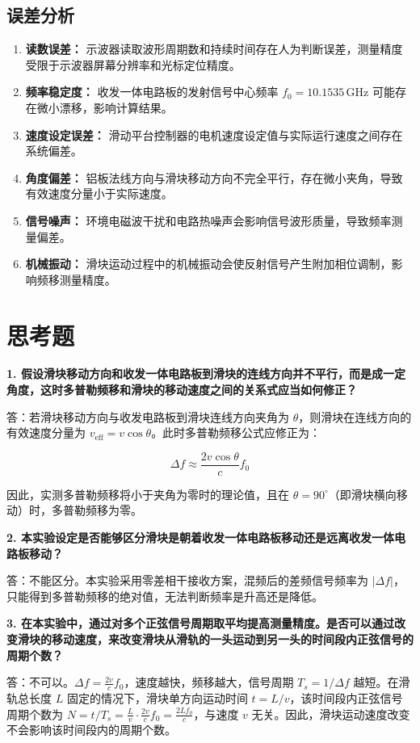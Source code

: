 \documentclass{../ElectromagneticFieldTemplate}
\begin{document}
\subsection{误差分析}

\begin{enumerate}
    \item \textbf{读数误差：} 示波器读取波形周期数和持续时间存在人为判断误差，测量精度受限于示波器屏幕分辨率和光标定位精度。
    \item \textbf{频率稳定度：} 收发一体电路板的发射信号中心频率 \(f_0 = 10.1535\,\text{GHz}\) 可能存在微小漂移，影响计算结果。
    \item \textbf{速度设定误差：} 滑动平台控制器的电机速度设定值与实际运行速度之间存在系统偏差。
    \item \textbf{角度偏差：} 铝板法线方向与滑块移动方向不完全平行，存在微小夹角，导致有效速度分量小于实际速度。
    \item \textbf{信号噪声：} 环境电磁波干扰和电路热噪声会影响信号波形质量，导致频率测量偏差。
    \item \textbf{机械振动：} 滑块运动过程中的机械振动会使反射信号产生附加相位调制，影响频移测量精度。
\end{enumerate}

\section{思考题}

\textbf{1. 假设滑块移动方向和收发一体电路板到滑块的连线方向并不平行，而是成一定角度，这时多普勒频移和滑块的移动速度之间的关系式应当如何修正？}

答：若滑块移动方向与收发电路板到滑块连线方向夹角为 \(\theta\)，则滑块在连线方向的有效速度分量为 \(v_{\text{eff}} = v \cos\theta\)。此时多普勒频移公式应修正为：

\[
\Delta f \approx \frac{2 v \cos\theta}{c} f_0
\]

因此，实测多普勒频移将小于夹角为零时的理论值，且在 \(\theta = 90^\circ\)（即滑块横向移动）时，多普勒频移为零。

\textbf{2. 本实验设定是否能够区分滑块是朝着收发一体电路板移动还是远离收发一体电路板移动？}

答：不能区分。本实验采用零差相干接收方案，混频后的差频信号频率为 \(|\Delta f|\)，只能得到多普勒频移的绝对值，无法判断频率是升高还是降低。

\textbf{3. 在本实验中，通过对多个正弦信号周期取平均提高测量精度。是否可以通过改变滑块的移动速度，来改变滑块从滑轨的一头运动到另一头的时间段内正弦信号的周期个数？}

答：不可以。\(\Delta f = \frac{2v}{c}f_0\)，速度越快，频移越大，信号周期 \(T_s = 1/\Delta f\) 越短。在滑轨总长度 \(L\) 固定的情况下，滑块单方向运动时间 \(t = L/v\)，该时间段内正弦信号周期个数为 \(N = t/T_s = \frac{L}{v} \cdot \frac{2v}{c}f_0 = \frac{2Lf_0}{c}\)，与速度 \(v\) 无关。因此，滑块运动速度改变不会影响该时间段内的周期个数。
\end{document}
